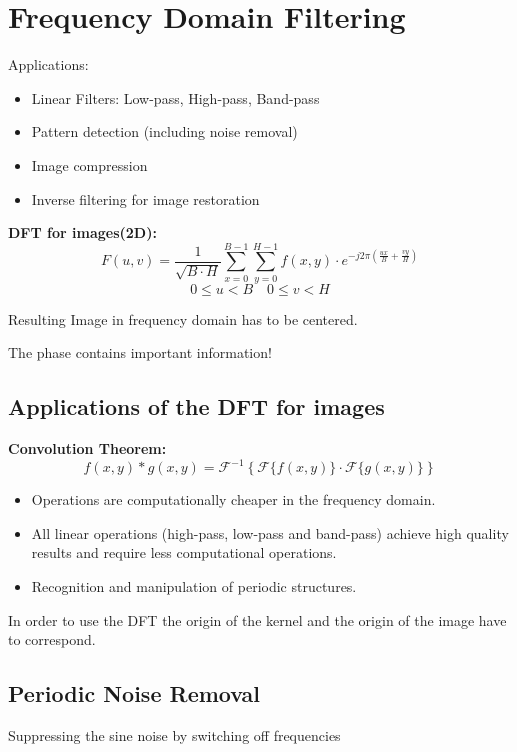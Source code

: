 \section{Frequency Domain Filtering}
Applications:
\begin{itemize}
    \item Linear Filters: Low-pass, High-pass, Band-pass
    \item Pattern detection (including noise removal)
    \item Image compression
    \item Inverse filtering for image restoration
\end{itemize}
\textbf{DFT for images(2D):}
\[
F(u,v) =\frac{1}{\sqrt{B\cdot H}} \sum_{x=0}^{B-1} \sum_{y=0}^{H-1} f(x,y)
\cdot
e^{-j2\pi\left(\frac{ux}{B} + \frac{vy}{H}\right)}
\]
\[
0 \leq u < B
\quad
0 \leq v < H
\]

Resulting Image in frequency domain has to be centered.

The phase contains important information!
\subsection{Applications of the DFT for images}
\textbf{Convolution Theorem:}
\[
f(x,y) * g(x,y) = \mathcal{F}^{-1}\left\{\mathcal{F}\{f(x,y)\} \cdot \mathcal{F}\{g(x,y)\}\right\}
\]
\begin{itemize}
    \item Operations are computationally cheaper in the frequency domain.
    \item All linear operations (high-pass, low-pass and band-pass) achieve high quality results and require less computational operations.
    \item Recognition and manipulation of periodic structures.
\end{itemize}
In order to use the DFT the origin of the kernel and the origin of the image
have to correspond.
\subsection{Periodic Noise Removal}
Suppressing the sine noise by switching off frequencies